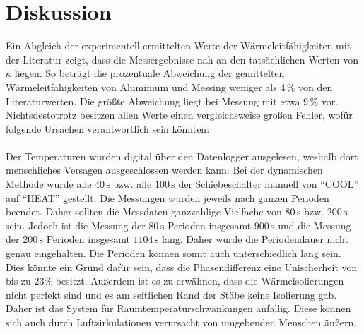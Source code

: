%

%
\section{Diskussion}
\label{sec:Diskussion}

Ein Abgleich der experimentell ermittelten Werte der Wärmeleitfähigkeiten mit der Literatur zeigt, dass die Messergebnisse nah 
an den tatsächlichen Werten von $\kappa$ liegen. So beträgt die prozentuale Abweichung der gemittelten Wärmeleitfähigkeiten von 
Aluminium und Messing weniger als 4\,$\unit{\percent}$ von den Literaturwerten. Die größte Abweichung liegt bei Messung mit etwa
9\,$\unit{\percent}$ vor. Nichtsdestotrotz besitzen allen Werte einen vergleichsweise großen Fehler, wofür folgende Ursachen
verantwortlich sein könnten:\\\\

Der Temperaturen wurden digital über den Datenlogger ausgelesen, weshalb dort menschliches Versagen ausgeschlossen werden kann.
Bei der dynamischen Methode wurde alle $40\,\unit{\second}$ bzw. alle $100\,\unit{\second}$ der Schiebeschalter manuell
von \enquote{COOL} auf \enquote{HEAT} gestellt. Die Messungen wurden jeweils nach ganzen Perioden beendet. Daher sollten die 
Messdaten ganzzahlige Vielfache von $80\,\unit{\second}$ bzw. $200\,\unit{\second}$ sein. Jedoch ist die Messung der 
$80\,\unit{\second}$ Perioden insgesamt $900\,\unit{\second}$ und die Messung der $200\,\unit{\second}$ Perioden insgesamt 
$1104\,\unit{\second}$ lang.
Daher wurde die Periodendauer nicht genau eingehalten. Die Perioden können somit auch unterschiedlich lang sein.
Dies könnte ein Grund dafür sein, dass die Phasendifferenz eine Unischerheit von bis zu $23{\%}$ besitzt.
Außerdem ist es zu erwähnen, dass die Wärmeisolierungen nicht perfekt sind und es am seitlichen Rand der Stäbe keine
Isolierung gab. Daher ist das System für Raumtemperaturschwankungen anfällig. Diese können sich auch durch Luftzirkulationen 
verursacht von umgebenden Menschen äußern.
%
